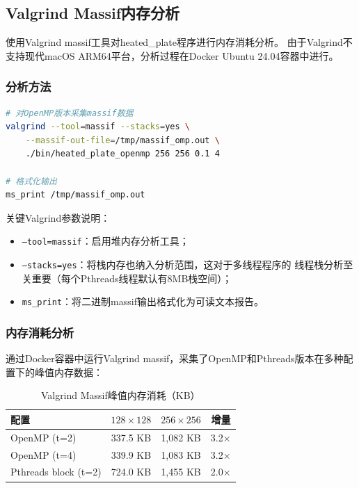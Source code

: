 \documentclass[UTF8,a4paper,12pt,fontset=none]{ctexart}
\begin{document}
\subsection{Valgrind Massif内存分析}

使用Valgrind massif工具对heated\_plate程序进行内存消耗分析。
由于Valgrind不支持现代macOS ARM64平台，分析过程在Docker Ubuntu 24.04容器中进行。

\subsubsection{分析方法}

\begin{lstlisting}[language=bash]
# 对OpenMP版本采集massif数据
valgrind --tool=massif --stacks=yes \
    --massif-out-file=/tmp/massif_omp.out \
    ./bin/heated_plate_openmp 256 256 0.1 4

# 格式化输出
ms_print /tmp/massif_omp.out
\end{lstlisting}

关键Valgrind参数说明：
\begin{itemize}[leftmargin=2.2em]
  \item \texttt{--tool=massif}：启用堆内存分析工具；
  \item \texttt{--stacks=yes}：将栈内存也纳入分析范围，这对于多线程程序的
    线程栈分析至关重要（每个Pthreads线程默认有8MB栈空间）；
  \item \texttt{ms\_print}：将二进制massif输出格式化为可读文本报告。
\end{itemize}

\subsubsection{内存消耗分析}

通过Docker容器中运行Valgrind massif，采集了OpenMP和Pthreads版本在多种配置下的峰值内存数据：

\begin{table}[H]
  \centering
  \caption{Valgrind Massif峰值内存消耗（KB）}
  \renewcommand{\arraystretch}{1.15}
  \begin{tabular}{lrrr}
    \toprule
    配置 & $128\times128$ & $256\times256$ & 增量 \\
    \midrule
    OpenMP (t=2) & 337.5 KB & 1,082 KB & 3.2× \\
    OpenMP (t=4) & 339.9 KB & 1,083 KB & 3.2× \\
    Pthreads block (t=2) & 724.0 KB & 1,455 KB & 2.0× \\
    \bottomrule
  \end{tabular}
\end{table}
\end{document}
